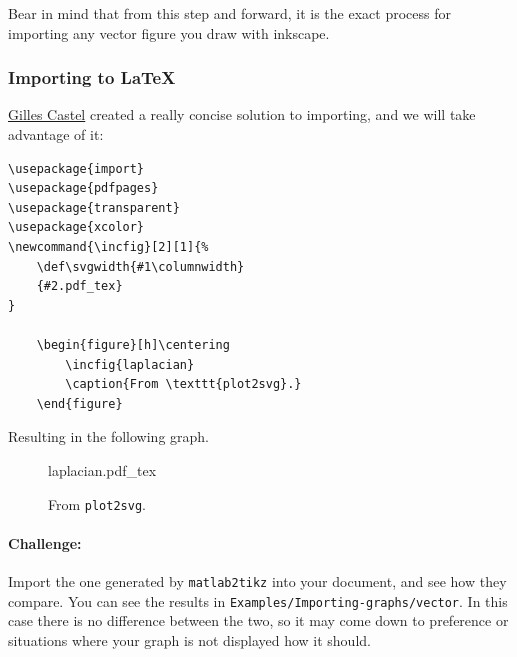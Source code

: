 Bear in mind that from this step and forward, it is the exact process for importing any vector figure you draw with inkscape.

\subsubsection{Importing to \LaTeX}
\href{https://github.com/gillescastel/}{Gilles Castel} created a really concise solution to importing, and we will take advantage of it:

\begin{lstlisting}
\usepackage{import}
\usepackage{pdfpages}
\usepackage{transparent}
\usepackage{xcolor}
\newcommand{\incfig}[2][1]{%
    \def\svgwidth{#1\columnwidth}
    {#2.pdf_tex}
}

    \begin{figure}[h]\centering
        \incfig{laplacian}
        \caption{From \texttt{plot2svg}.}
    \end{figure}

\end{lstlisting}

Resulting in the following graph.
\begin{figure}[h]\centering
    \def\svgwidth{0.8\columnwidth}
    {laplacian.pdf_tex}
    \caption{From \texttt{plot2svg}.}
\end{figure}

\paragraph{Challenge:}
Import the one generated by \texttt{matlab2tikz} into your document, and see how they compare.
You can see the results in \texttt{Examples/Importing-graphs/vector}.
In this case there is no difference between the two, so it may come down to preference or situations where your graph is not displayed how it should.
